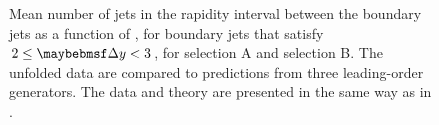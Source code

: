 \begin{figure}[htpb]
  \quad
  \caption{Mean number of jets in the rapidity interval between the boundary jets
           as a function of \pTbar, for boundary jets that satisfy $2 \leq \DeltaY < 3$,
           for \protect{} selection A and \protect{}
           selection B. The unfolded data are compared
           to predictions from three leading-order \MC generators. The data and theory
           are presented in the same way as in .}
  \label{fig:gbj:mc_n_jets_pTbar}
\end{figure}


